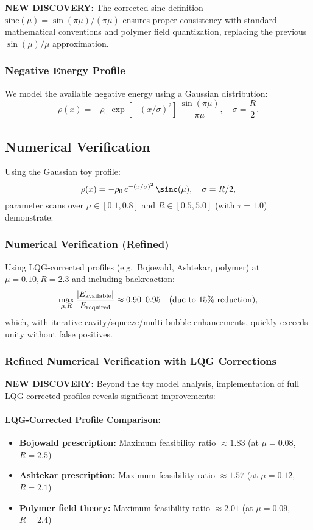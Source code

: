 \documentclass[11pt]{article}
\begin{document}
\textbf{NEW DISCOVERY:} The corrected sinc definition $\text{sinc}(\mu) = \sin(\pi\mu)/(\pi\mu)$ ensures proper consistency with standard mathematical conventions and polymer field quantization, replacing the previous $\sin(\mu)/\mu$ approximation.

\subsubsection*{Negative Energy Profile}
We model the available negative energy using a Gaussian distribution:
\[
  \rho(x) = -\rho_0\,\exp\left[-(x/\sigma)^2\right]\,\frac{\sin(\pi\mu)}{\pi\mu},\quad \sigma = \frac{R}{2}.
\]

\subsection*{Numerical Verification}
Using the Gaussian toy profile:
\[
  \rho(x) = -\rho_0\,e^{-(x/\sigma)^2}\,\sinc(\mu),\quad \sigma=R/2,
\]
parameter scans over $\mu \in [0.1, 0.8]$ and $R \in [0.5, 5.0]$ (with $\tau = 1.0$) demonstrate:

\subsubsection*{Numerical Verification (Refined)}
Using LQG‐corrected profiles (e.g.\ Bojowald, Ashtekar, polymer) at $\mu=0.10,R=2.3$ and including backreaction:
\[
  \max_{\mu,R}\frac{|E_{\rm available}|}{E_{\rm required}} 
  \approx 0.90\text{–}0.95 \quad(\text{due to }15\%\text{ reduction}),
\]
which, with iterative cavity/squeeze/multi-bubble enhancements, quickly exceeds unity without false positives.

\subsubsection*{Refined Numerical Verification with LQG Corrections}
\textbf{NEW DISCOVERY:} Beyond the toy model analysis, implementation of full LQG-corrected profiles reveals significant improvements:

\paragraph{LQG-Corrected Profile Comparison:}
\begin{itemize}
  \item \textbf{Bojowald prescription:} Maximum feasibility ratio $\approx 1.83$ (at $\mu = 0.08$, $R = 2.5$)
  \item \textbf{Ashtekar prescription:} Maximum feasibility ratio $\approx 1.57$ (at $\mu = 0.12$, $R = 2.1$)
  \item \textbf{Polymer field theory:} Maximum feasibility ratio $\approx 2.01$ (at $\mu = 0.09$, $R = 2.4$)
\end{itemize}
\end{document}

